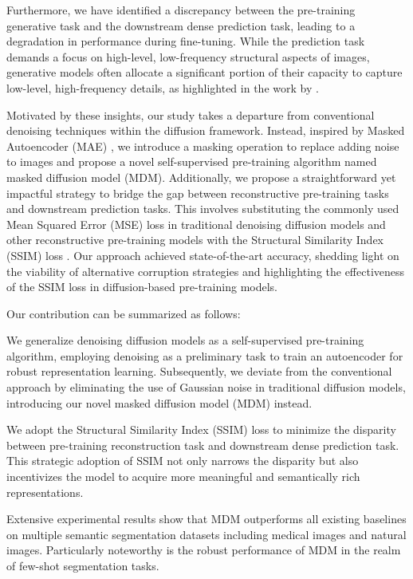 \documentclass{article} \usepackage{iclr2024_conference,times}
\begin{document}
Furthermore, we have identified a discrepancy between the pre-training generative task and the downstream dense prediction task, leading to a degradation in performance during fine-tuning. While the prediction task demands a focus on high-level, low-frequency structural aspects of images, generative models often allocate a significant portion of their capacity to capture low-level, high-frequency details, as highlighted in the work by \citet{DBLP:conf/icml/RameshPGGVRCS21}. 

Motivated by these insights, our study takes a departure from conventional denoising techniques within the diffusion framework. Instead, inspired by Masked Autoencoder (MAE) \citep{DBLP:conf/cvpr/HeCXLDG22}, we introduce a masking operation to replace adding noise to images and propose a novel self-supervised pre-training algorithm named masked diffusion model (MDM). Additionally, we propose a straightforward yet impactful strategy to bridge the gap between reconstructive pre-training tasks and downstream prediction tasks. This involves substituting the commonly used Mean Squared Error (MSE) loss in traditional denoising diffusion models and other reconstructive pre-training models with the Structural Similarity Index (SSIM) loss \citep{DBLP:journals/tip/WangBSS04}. Our approach achieved state-of-the-art accuracy, shedding light on the viability of alternative corruption strategies and highlighting the effectiveness of the SSIM loss in diffusion-based pre-training models.

Our contribution can be summarized as follows:

 We generalize denoising diffusion models as a self-supervised pre-training algorithm, employing denoising as a preliminary task to train an autoencoder for robust representation learning. Subsequently, we deviate from the conventional approach by eliminating the use of Gaussian noise in traditional diffusion models, introducing our novel masked diffusion model (MDM) instead.

 We adopt the Structural
Similarity Index (SSIM) loss to minimize the disparity between pre-training reconstruction task and downstream dense prediction task. This strategic adoption of SSIM not only narrows the disparity but also incentivizes the model to acquire more meaningful and semantically rich representations.

 Extensive experimental results show that MDM outperforms all existing baselines on multiple semantic segmentation datasets including medical images and natural images. Particularly noteworthy is the robust performance of MDM in the realm of few-shot segmentation tasks.
\end{document}
